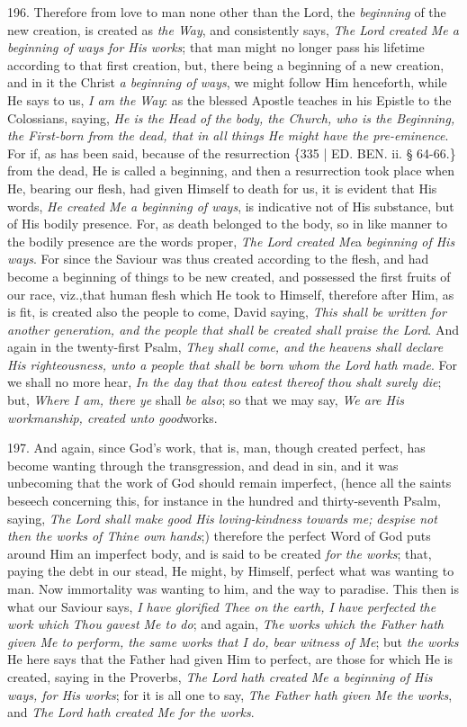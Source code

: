 196. Therefore from love to
man none other than the Lord, the \emph{beginning} of the new
creation, is created as \emph{the Way}, and consistently says, \emph{The
Lord created Me a beginning of ways for His works}; that man might
no longer pass his lifetime according to that first creation, but,
there being a beginning of a new creation, and in it the Christ \emph{a
beginning of ways}, we might follow Him henceforth, while He says
to us, \emph{I am the Way}: as the blessed Apostle teaches in his
Epistle to the Colossians, saying, \emph{He is the Head of the body, the
Church, who is the Beginning, the First-born from the dead, that in
all things He might have the pre-eminence}. For if, as has been
said, because of the resurrection \{335 | ED. BEN. ii. § 64-66.\}
from the dead, He is called a beginning, and then a resurrection took
place when He, bearing our flesh, had given Himself to death for us,
it is evident that His words, \emph{He created Me a beginning of ways},
is indicative not of His substance, but of His bodily presence. For,
as death belonged to the body, so in like manner to the bodily
presence are the words proper, \emph{The Lord created Me}a \emph{beginning
of His ways}. For since the Saviour was thus created according to
the flesh, and had become a beginning of things to be new created, and
possessed the first fruits of our race, viz.,\emph{}that human flesh
which He took to Himself, therefore after Him, as is fit, is created
also the people to come, David saying, \emph{This shall be written for
another generation, and the people that shall be created shall praise
the Lord}. And again in the twenty-first Psalm, \emph{They shall come,
and the heavens shall declare His righteousness, unto a people that
shall be born whom the Lord hath made}. For we shall no more hear, \emph{In
the day that thou eatest thereof thou shalt surely die}; but, \emph{Where
I am, there ye} shall \emph{be also}; so that we may say, \emph{We are
His workmanship, created unto good}works.

197. And again, since God's
work, that is, man, though created perfect, has become wanting through
the transgression, and dead in sin, and it was unbecoming that the
work of God should remain imperfect, (hence all the saints beseech
concerning this, for instance in the hundred and thirty-seventh Psalm,
saying, \emph{The Lord shall make good His loving-kindness towards me;}
\emph{despise not then the works of Thine own hands};) therefore the
perfect Word of God puts around Him an imperfect body, and is said to
be created \emph{for the works}; that, paying the debt in our stead,
He might, by Himself, perfect what was wanting to man. Now immortality
was wanting to him, and the way to paradise. This then is what our
Saviour says, \emph{I have glorified Thee on the earth, I have
perfected the work which} \emph{Thou gavest Me to do};
and again, \emph{The works which the Father hath given Me to perform, the
same works that I do, bear witness of Me}; but \emph{the works} He
here says that the Father had given Him to perfect, are those for
which He is created, saying in the Proverbs, \emph{The Lord hath created
Me a beginning of His ways, for His works}; for it is all one to
say, \emph{The Father hath given Me the works}, and \emph{The Lord hath
created Me for the works}.

